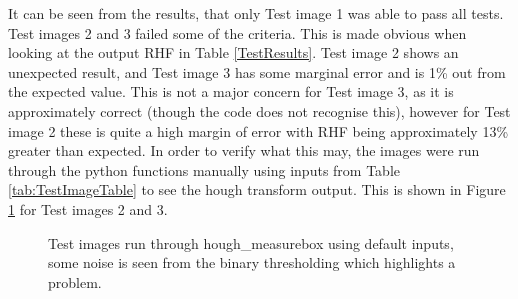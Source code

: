 \documentclass{article}
\begin{document}
    It can be seen from the results, that only Test image 1 was able to pass all tests. Test images 2 and 3 failed some of the criteria. This is made obvious when looking at the output RHF in Table \ref{TestResults}. Test image 2 shows an unexpected result, and Test image 3 has some marginal error and is 1\% out from the expected value. This is not a major concern for Test image 3, as it is approximately correct (though the code does not recognise this), however for Test image 2 these is quite a high margin of error with RHF being approximately 13\% greater than expected. In order to verify what this may, the images were run through the python functions manually using inputs from Table \ref{tab:TestImageTable} to see the hough transform output. This is shown in Figure \ref{TestImagesProcessed} for Test images 2 and 3.

    \begin{figure}[h]
        \centering
        \hfill
        \caption{Test images run through hough\_measurebox using default inputs, some noise is seen from the binary thresholding which highlights a problem.}
    \label{TestImagesProcessed}
    \end{figure}
\end{document}
